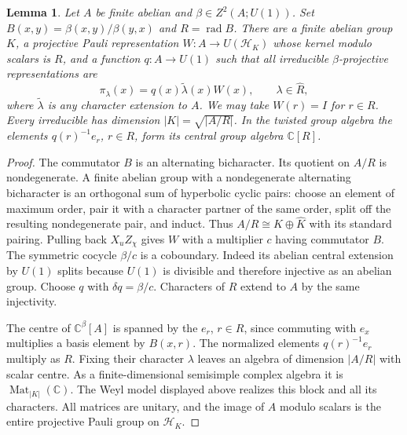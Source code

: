 \documentclass[11pt]{amsart}
\newtheorem{lemma}[theorem]{Lemma}
\theoremstyle{definition}\newtheorem{definition}[theorem]{Definition}
\newcommand{\C}{\mathbb C}
\newcommand{\rad}{\operatorname{rad}}
\begin{document}
\begin{lemma}\label{lem:heis}
Let $A$ be finite abelian and $\beta\in Z^2(A;U(1))$. Set
$B(x,y)=\beta(x,y)/\beta(y,x)$ and $R=\rad B$.
There are a finite abelian group $K$, a projective Pauli representation
$W:A\to U(\mathcal H_K)$ whose kernel modulo scalars is $R$, and a function
$q:A\to U(1)$ such that all irreducible $\beta$-projective representations are
\[
 \pi_\lambda(x)=q(x)\widetilde\lambda(x)W(x),\qquad
 \lambda\in\widehat R,
\]
where $\widetilde\lambda$ is any character extension to $A$.
We may take $W(r)=I$ for $r\in R$. Every irreducible has dimension
$|K|=\sqrt{|A/R|}$. In the twisted group algebra the elements
$q(r)^{-1}e_r$, $r\in R$, form its central group algebra $\C[R]$.
\end{lemma}
\begin{proof}
The commutator $B$ is an alternating bicharacter. Its quotient on $A/R$ is
nondegenerate. A finite abelian group with a nondegenerate alternating
bicharacter is an orthogonal sum of hyperbolic cyclic pairs: choose an element
of maximum order, pair it with a character partner of the same order, split
off the resulting nondegenerate pair, and induct. Thus
$A/R\cong K\oplus\widehat K$ with its standard pairing.
Pulling back $X_uZ_\chi$ gives $W$ with a multiplier $c$ having commutator $B$.
The symmetric cocycle $\beta/c$ is a coboundary. Indeed its abelian central
extension by $U(1)$ splits because $U(1)$ is divisible and therefore injective
as an abelian group. Choose $q$ with $\delta q=\beta/c$.
Characters of $R$ extend to $A$ by the same injectivity.

The centre of $\C^\beta[A]$ is spanned by the $e_r$, $r\in R$, since commuting
with $e_x$ multiplies a basis element by $B(x,r)$. The normalized elements
$q(r)^{-1}e_r$ multiply as $R$. Fixing their character $\lambda$ leaves an
algebra of dimension $|A/R|$ with scalar centre. As a finite-dimensional
semisimple complex algebra it is $\operatorname{Mat}_{|K|}(\C)$.
The Weyl model displayed above realizes this block and all its characters.
All matrices are unitary, and the image of $A$ modulo scalars is the entire
projective Pauli group on $\mathcal H_K$.
\end{proof}
\end{document}
